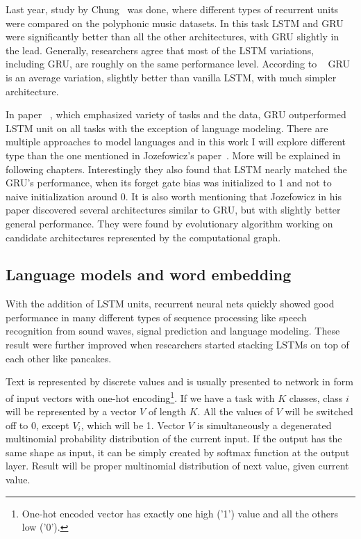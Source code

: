 Last year, study by Chung~\cite{DBLP:journals/corr/ChungGCB14} was done, where different types of recurrent units were compared on the polyphonic music datasets. In this task LSTM and GRU were significantly better than all the other architectures, with GRU slightly in the lead. Generally, researchers agree that most of the LSTM variations, including GRU, are roughly on the same performance level. According to ~\cite{DBLP:journals/corr/GreffSKSS15} GRU is an average variation, slightly better than vanilla LSTM, with much simpler architecture.

In paper ~\cite{DBLP:conf/icml/JozefowiczZS15}, which emphasized variety of tasks and the data, GRU outperformed LSTM unit on all tasks with the exception of language modeling. There are multiple approaches to model languages and in this work I will explore different type than the one mentioned in Jozefowicz's paper~\cite{DBLP:conf/icml/JozefowiczZS15}. More will be explained in following chapters. Interestingly they also found that LSTM nearly matched the GRU's performance, when its forget gate bias was initialized to 1 and not to naive initialization around 0.
It is also worth mentioning that Jozefowicz in his paper discovered several architectures similar to GRU, but with slightly better general performance. They were found by evolutionary algorithm working on candidate architectures  represented by the computational graph.

\subsection{Language models and word embedding}\label{subsec:lmAndEmbedd}

With the addition of LSTM units, recurrent neural nets quickly showed good performance in many different types of sequence processing like speech recognition from sound waves, signal prediction and language modeling. These result were further improved when researchers started stacking LSTMs on top of each other like pancakes.

Text is represented by discrete values and is usually presented to network in form of input vectors with one-hot encoding\footnote{One-hot encoded vector has exactly one high ('1') value and all the others low ('0').}. If we have a task with $ K $ classes, class $ i $ will be represented by a vector $ V $ of length $ K $. All the values of $ V $ will be switched off to 0, except $ V_i $, which will be 1. Vector $ V $ is simultaneously a degenerated multinomial probability distribution of the current input. If the output has the same shape as input, it can be simply created by softmax function at the output layer. Result will be proper multinomial distribution of next value, given current value.

